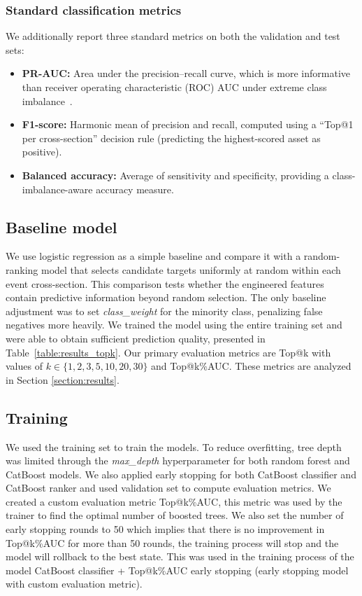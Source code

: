 \documentclass{ieeeaccess}
\begin{document}
\subsubsection{Standard classification metrics}
We additionally report three standard metrics on both the validation and test sets:
\begin{itemize}
    \item \textbf{PR-AUC:} Area under the precision--recall curve, which is more informative than receiver operating characteristic (ROC) AUC under extreme class imbalance~\cite{elkan2001cost}.
    \item \textbf{F1-score:} Harmonic mean of precision and recall, computed using a ``Top@1 per cross-section'' decision rule (predicting the highest-scored asset as positive).
    \item \textbf{Balanced accuracy:} Average of sensitivity and specificity, providing a class-imbalance-aware accuracy measure.
\end{itemize}

\subsection{Baseline model}

We use logistic regression as a simple baseline and compare it with a random-ranking model that selects candidate targets uniformly at random within each event cross-section. This comparison tests whether the engineered features contain predictive information beyond random selection. The only baseline adjustment was to set \textit{class\_weight} for the minority class, penalizing false negatives more heavily. We trained the model using the entire training set and were able to obtain sufficient prediction quality, presented in Table~\ref{table:results_topk}. Our primary evaluation metrics are Top@k with values of $k \in \{1, 2, 3, 5, 10, 20, 30\}$ and Top@k\%AUC. These metrics are analyzed in Section \ref{section:results}.

\subsection{Training}
We used the training set to train the models. To reduce overfitting, tree depth was limited through the \textit{max\_depth} hyperparameter for both random forest and CatBoost models. We also applied early stopping for both CatBoost classifier and CatBoost ranker and used validation set to compute evaluation metrics. We created a custom evaluation metric Top@k\%AUC, this metric was used by the trainer to find the optimal number of boosted trees. We also set the number of early stopping rounds to 50 which implies that there is no improvement in Top@k\%AUC for more than 50 rounds, the training process will stop and the model will rollback to the best state. This was used in the training process of the model CatBoost classifier + Top@k\%AUC early stopping (early stopping model with custom evaluation metric).
\end{document}
